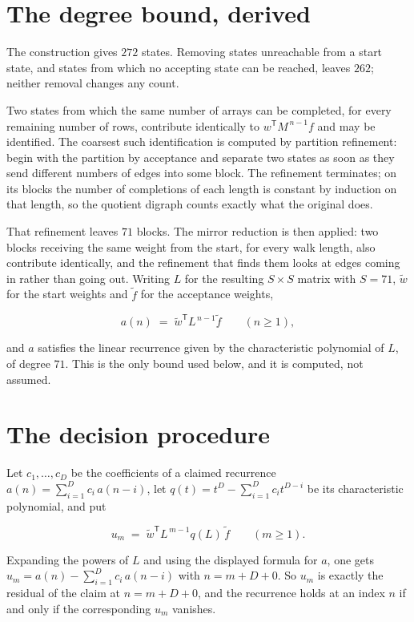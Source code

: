 \documentclass[11pt]{article}
\theoremstyle{definition}
\begin{document}
\section{The degree bound, derived}

The construction gives $272$ states. Removing states unreachable from a start state, and states from which no accepting state can be reached, leaves $262$; neither removal changes any count.

Two states from which the same number of arrays can be completed, for every remaining number of rows, contribute identically to $w^{\mathsf T}M^{\,n-1}f$ and may be identified. The coarsest such identification is computed by partition refinement: begin with the partition by acceptance and separate two states as soon as they send different numbers of edges into some block. The refinement terminates; on its blocks the number of completions of each length is constant by induction on that length, so the quotient digraph counts exactly what the original does.

That refinement leaves $71$ blocks. The mirror reduction is then applied: two blocks receiving the same weight from the start, for every walk length, also contribute identically, and the refinement that finds them looks at edges coming in rather than going out. Writing $L$ for the resulting $S \times S$ matrix with $S = 71$, $\tilde w$ for the start weights and $\tilde f$ for the acceptance weights,

\[a(n) \;=\; \tilde w^{\mathsf T} L^{\,n-1} \tilde f \qquad (n \ge 1),\]

and $a$ satisfies the linear recurrence given by the characteristic polynomial of $L$, of degree $71$. This is the only bound used below, and it is computed, not assumed.

\section{The decision procedure}

Let $c_1,\dots,c_D$ be the coefficients of a claimed recurrence $a(n) = \sum_{i=1}^{D} c_i\,a(n-i)$, let $q(t) = t^{D} - \sum_{i=1}^{D} c_i t^{D-i}$ be its characteristic polynomial, and put

\[u_m \;=\; \tilde w^{\mathsf T} L^{\,m-1} q(L)\,\tilde f \qquad (m \ge 1).\]

Expanding the powers of $L$ and using the displayed formula for $a$, one gets $u_m = a(n) - \sum_{i=1}^{D} c_i\,a(n-i)$ with $n = m + D + 0$. So $u_m$ is exactly the residual of the claim at $n = m + D + 0$, and the recurrence holds at an index $n$ if and only if the corresponding $u_m$ vanishes.
\end{document}
